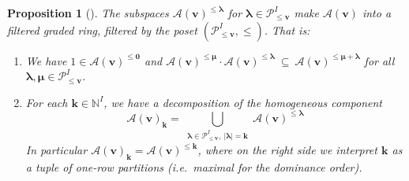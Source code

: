 \documentclass[11pt,reqno]{amsart}
\renewcommand{\mathbf}{\mathbold}
\numberwithin{equation}{section}
\newtheorem{Proposition}[equation]{Proposition}
\theoremstyle{definition}
\newcommand{\cA}{\mathcal{A}}
\newcommand{\cP}{\mathcal{P}}
\newcommand{\bk}{\mathbf{k}}
\newcommand{\bv}{\mathbf{v}}
\newcommand{\NN}{\mathbb{N}}
\renewcommand{\bv}{\mathbf{v}} %
\newcommand{\vertexset}{I}
\newcommand{\Partitions}{\cP}
\newcommand{\bla}{{\boldsymbol{\lambda}}}
\newcommand{\bmu}{{\boldsymbol{\mu}}}
\newcommand{\qzast}{\cA}
\begin{document}
\begin{Proposition}[\mbox{\cite[Proposition 6.1]{BFN1}}]
\label{prop: filtration defined}
The subspaces $\qzast(\bv)^{\leq \bla}$ for $\bla \in \Partitions_{\leq \bv}^\vertexset$ make $\qzast(\bv)$  into a filtered graded ring, filtered by the poset $(\Partitions_{\leq \bv}^\vertexset, \leq)$.
That is:
\begin{enumerate}
    \item We have $1 \in \qzast(\bv)^{\leq \mathbf{0}}$ and  $\qzast(\bv)^{\leq \bmu} \cdot \qzast(\bv)^{\leq \bla} \ \subseteq \ \qzast(\bv)^{\leq \bmu + \bla}$  for all $\bla,\bmu \in \Partitions_{\leq \bv}^\vertexset$.
    
    \item For each $\bk \in \NN^\vertexset$, we have a decomposition of the homogeneous component
    $$
    \qzast(\bv)_\bk = \bigcup_{\substack{\bla \in \Partitions^\vertexset_{\leq \bv},~ |\bla| = \bk}} \qzast(\bv)^{\leq \bla}
    $$
    In particular $\qzast(\bv)_{\bk} = \qzast(\bv)^{\leq \bk}$, where on the right side we interpret $\bk$ as a tuple of one-row partitions (i.e.~maximal for the dominance order).
\end{enumerate}
\end{Proposition}
\end{document}
